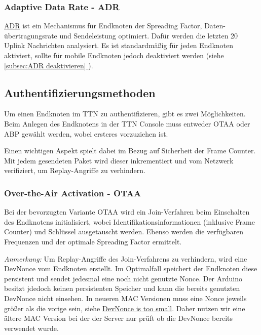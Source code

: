 \documentclass[12pt]{article}
\newcommand*{\fullref}[1]{\hyperref[{#1}]{\ref{#1} \nameref{#1}}}   %
\begin{document}
      \subsubsection{Adaptive Data Rate - ADR}   
        \href{https://www.thethingsnetwork.org/docs/lorawan/adaptive-data-rate/}{ADR} ist ein Mechanismus für Endknoten
        der Spreading Factor, Daten-\\übertragungsrate und Sendeleistung optimiert. Dafür werden die letzten 20 Uplink Nachrichten analysiert.
        Es ist standardmäßig für jeden Endknoten aktiviert, sollte für mobile Endknoten jedoch deaktiviert werden (siehe\\\underline{\fullref{subsec:ADR deaktivieren}}).



    \subsection{Authentifizierungsmethoden} \label{subsec:Authentifizierungsmethoden}
      Um einen Endknoten im TTN zu authentifizieren, gibt es zwei Möglichkeiten. Beim Anlegen des Endknotens in der TTN Console muss entweder
      OTAA oder ABP gewählt werden, wobei ersteres vorzuziehen ist.

      Einen wichtigen Aspekt spielt dabei im Bezug auf Sicherheit der Frame Counter. Mit jedem gesendeten Paket wird dieser inkrementiert
      und vom Netzwerk verifiziert, um Replay-Angriffe zu verhindern.



      \subsubsection{Over-the-Air Activation - OTAA}
        Bei der bevorzugten Variante OTAA wird ein Join-Verfahren beim Einschalten des Endknotens initialisiert,
        wobei Identifikationsinformationen (inklusive Frame Counter) und Schlüssel ausgetauscht werden. Ebenso werden die verfügbaren Frequenzen und
        der optimale Spreading Factor ermittelt.

        \textit{Anmerkung:} Um Replay-Angriffe des Join-Verfahrens zu verhindern, wird eine DevNonce vom Endknoten erstellt.
        Im Optimalfall speichert der Endknoten diese persistent und sendet jedesmal eine noch nicht genutzte Nonce. Der Arduino besitzt jdedoch keinen persistenten Speicher und kann die
        bereits genutzten DevNonce nicht einsehen. In neueren MAC Versionen muss eine Nonce jeweils größer als die
        vorige sein, siehe \href{https://www.thethingsnetwork.org/forum/t/devnonce-is-too-small-what-to-do/46330}{DevNonce is too small}.
        Daher nutzen wir eine ältere MAC Version bei der der Server nur prüft ob die DevNonce bereits verwendet wurde.
\end{document}
